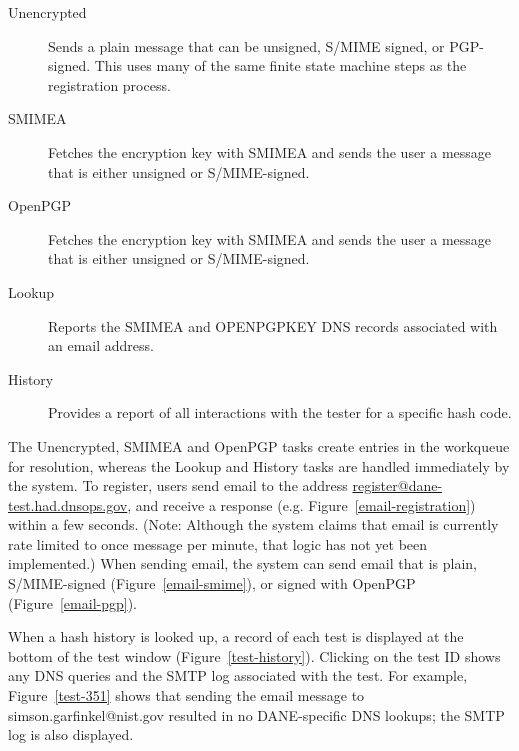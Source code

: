 \documentclass[preprint,3p,11pt]{elsarticle}
\begin{document}
\begin{description}
\item[Unencrypted] Sends a plain message that can be unsigned, S/MIME
  signed, or PGP-signed. This uses many of the same finite state
  machine steps as the registration process. 
\item[SMIMEA] Fetches the encryption key with SMIMEA and sends the
  user a message that is either unsigned or S/MIME-signed.
\item[OpenPGP] Fetches the encryption key with SMIMEA and sends the
  user a message that is either unsigned or S/MIME-signed.
\item[Lookup] Reports the SMIMEA and OPENPGPKEY DNS records associated
  with an email address.
\item[History] Provides a report of all interactions with the tester
  for a specific hash code.
\end{description}

The Unencrypted, SMIMEA and OpenPGP tasks create entries in
the workqueue for resolution, whereas the Lookup and History tasks are
handled immediately by the system.  To register, users send email to
the address \url{register@dane-test.had.dnsops.gov}, and receive a
response (e.g. Figure~\ref{email-registration}) within a few
seconds. (Note: Although the system claims that email is currently
rate limited to once message per minute, that logic has not yet been
implemented.) When sending email, the system can
send email that is plain, S/MIME-signed (Figure~\ref{email-smime}), or
signed with OpenPGP (Figure~\ref{email-pgp}).


When a hash history is looked up, a record of each test is displayed
at the bottom of the test window (Figure~\ref{test-history}). Clicking
on the test ID shows any DNS queries and the SMTP log associated with
the test. For example, Figure~\ref{test-351} shows that sending the
email message to simson.garfinkel@nist.gov resulted in no
DANE-specific DNS lookups; the SMTP log is also displayed.

\end{document}
